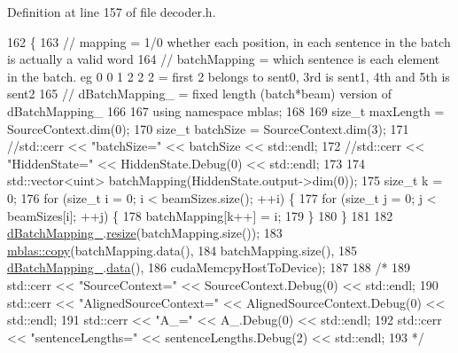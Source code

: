 Definition at line 157 of file decoder.\+h.


\begin{DoxyCode}
162         \{
163           \textcolor{comment}{// mapping = 1/0 whether each position, in each sentence in the batch is actually a valid word}
164           \textcolor{comment}{// batchMapping = which sentence is each element in the batch. eg 0 0 1 2 2 2 = first 2 belongs
       to sent0, 3rd is sent1, 4th and 5th is sent2}
165           \textcolor{comment}{// dBatchMapping\_ = fixed length (batch*beam) version of dBatchMapping\_}
166 
167           \textcolor{keyword}{using namespace }mblas;
168 
169           \textcolor{keywordtype}{size\_t} maxLength = SourceContext.dim(0);
170           \textcolor{keywordtype}{size\_t} batchSize = SourceContext.dim(3);
171           \textcolor{comment}{//std::cerr << "batchSize=" << batchSize << std::endl;}
172           \textcolor{comment}{//std::cerr << "HiddenState=" << HiddenState.Debug(0) << std::endl;}
173 
174           std::vector<uint> batchMapping(HiddenState.output->dim(0));
175           \textcolor{keywordtype}{size\_t} k = 0;
176           \textcolor{keywordflow}{for} (\textcolor{keywordtype}{size\_t} i = 0; i < beamSizes.size(); ++i) \{
177             \textcolor{keywordflow}{for} (\textcolor{keywordtype}{size\_t} j = 0; j < beamSizes[i]; ++j) \{
178               batchMapping[k++] = i;
179             \}
180           \}
181 
182           \hyperlink{classamunmt_1_1GPU_1_1Decoder_1_1Alignment_ab90a6f08ed51961ec0e95125a3024ac8}{dBatchMapping\_}.\hyperlink{classamunmt_1_1GPU_1_1mblas_1_1Array_ac5a8bd146e017b8bacd499053ca159cb}{resize}(batchMapping.size());
183           \hyperlink{namespaceamunmt_1_1GPU_1_1mblas_a6531a040aa422fcd149f89b92f6d2585}{mblas::copy}(batchMapping.data(),
184               batchMapping.size(),
185               \hyperlink{classamunmt_1_1GPU_1_1Decoder_1_1Alignment_ab90a6f08ed51961ec0e95125a3024ac8}{dBatchMapping\_}.\hyperlink{classamunmt_1_1GPU_1_1mblas_1_1Array_a4034555b63c429f5f3113e7297094861}{data}(),
186               cudaMemcpyHostToDevice);
187 
188           \textcolor{comment}{/*}
189 \textcolor{comment}{          std::cerr << "SourceContext=" << SourceContext.Debug(0) << std::endl;}
190 \textcolor{comment}{          std::cerr << "AlignedSourceContext=" << AlignedSourceContext.Debug(0) << std::endl;}
191 \textcolor{comment}{          std::cerr << "A\_=" << A\_.Debug(0) << std::endl;}
192 \textcolor{comment}{          std::cerr << "sentenceLengths=" << sentenceLengths.Debug(2) << std::endl;}
193 \textcolor{comment}{          */}

\end{DoxyCode}
